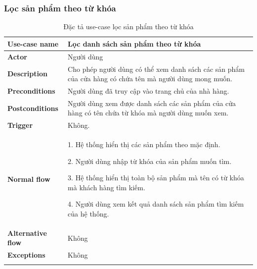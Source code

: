 \subsubsection{Lọc sản phẩm theo từ khóa}
\begin{center}
    {
        \setlength\extrarowheight{6pt}
        \begin{longtable}{| p{} | p{} |}
            \hline
            \textbf{Use-case name}
             &
            Lọc danh sách sản phẩm theo từ khóa
            \\
            \hline
            \textbf{Actor}
             &
            Người dùng
            \\
            \hline
            \textbf{Description}
             &
            Cho phép người dùng có thể xem danh sách các sản phẩm của cửa hàng có chứa tên mà người dùng mong muốn.
            \\
            \hline
            \textbf{Preconditions}
             &
            Người dùng đã truy cập vào trang chủ của nhà hàng.
            \\
            \hline
            \textbf{Postconditions}
             &
            Người dùng xem được danh sách các sản phẩm  của cửa hàng có tên chứa từ khóa mà người dùng muốn xem.
            \\
            \hline
            \textbf{Trigger}
             &
            Không.
            \\
            \hline
            \textbf{Normal flow}
             &
            1. Hệ thống hiển thị các sản phẩm theo mặc định.

            2. Người dùng nhập từ khóa của sản phẩm muốn tìm.

            3. Hệ thống hiển thị toàn bộ sản phẩm mà tên có từ khóa mà khách hàng tìm kiếm.

            4. Người dùng xem kết quả danh sách sản phẩm tìm kiếm của hệ thống.
            \\
            \hline
            \textbf{Alternative flow}
             &
            Không
            \\
            \hline
            \textbf{Exceptions}
             &
            Không
            \\
            \hline
            \caption{Đặc tả use-case lọc sản phẩm theo từ khóa}
        \end{longtable}
    }
\end{center}


